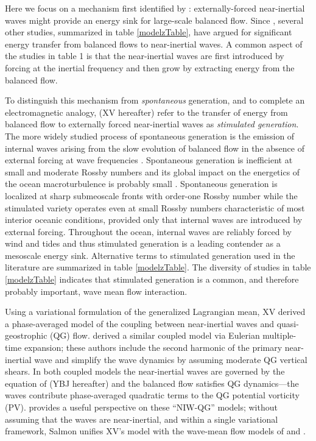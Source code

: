 \documentclass{jfm}
\newcommand{\NIW}{near-inertial wave}
\newcommand{\macrot}{macroturbulence}
\begin{document}
Here we focus on a mechanism first identified  by
\cite{gertz_straub2009}:  externally-forced \NIW s might provide an energy sink
for large-scale balanced flow. Since \cite{gertz_straub2009}, several other studies,
summarized in table \ref{modelzTable}, have argued for significant energy transfer
from balanced flows to \NIW s. A common aspect of the studies in table 1 is that
the  near-inertial waves are first introduced by  forcing at the inertial frequency  and then
grow by extracting energy from the balanced flow.

To distinguish this mechanism
from \textit{spontaneous} generation, and to complete an electromagnetic analogy,
 \citet{xie_vanneste2015} (XV hereafter) refer to the transfer of energy from balanced flow to externally forced near-inertial
waves  as  \textit{stimulated generation}.  The more widely studied process
of spontaneous generation is the emission of internal waves arising
from the slow evolution of balanced flow in the absence  of external forcing at
wave frequencies \citep{vanneste2013}. Spontaneous generation is inefficient at
small and  moderate Rossby numbers and its global impact on the energetics of the
ocean \macrot{}   is probably small \citep{danioux_etal2012, nagai_etal2015}.
Spontaneous generation is localized at sharp submeoscale fronts with  order-one
Rossby  number   \citep[e.g., ][]{shakespeare_hogg2017} while the stimulated variety  operates even at  small Rossby numbers characteristic of most interior oceanic conditions, provided only that internal waves are introduced by external forcing. Throughout the ocean, internal waves are reliably forced by wind and tides and thus stimulated generation is a leading contender as a mesoscale energy sink. Alternative terms to stimulated generation
used in the  literature are  summarized in  table \ref{modelzTable}.
The diversity of  studies in table \ref{modelzTable} indicates that stimulated
generation is a common, and therefore probably  important, wave mean flow interaction.

 Using a variational formulation of the generalized Lagrangian mean, XV derived a  phase-averaged  model of the  coupling between near-inertial waves and quasi-geostrophic (QG) flow. \cite{wagner_young2016} derived a similar coupled model via Eulerian multiple-time expansion; these authors include the  second harmonic of the primary near-inertial wave  and simplify the wave dynamics by assuming  moderate QG vertical shears.  In both coupled models the near-inertial waves are governed by the equation of \cite{young_benjelloul1997} (YBJ hereafter) and the balanced flow satisfies QG dynamics---the waves contribute phase-averaged quadratic terms to the QG potential vorticity (PV). \cite{salmon2016} provides a useful perspective on these ``NIW-QG'' models; without assuming that the  waves are near-inertial, and within a single variational framework, Salmon unifies XV's model with the  wave-mean flow models of \cite{buhler_mcintyre1998} and  \cite{wagner_young2015}.
\end{document}
